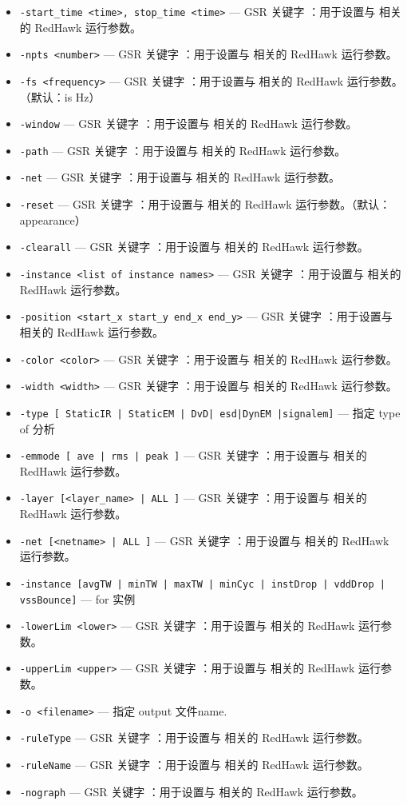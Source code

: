 \begin{itemize}
\item \texttt{-start\_time <time>, stop\_time <time>} — GSR 关键字 ：用于设置与  相关的 RedHawk 运行参数。
\item \texttt{-npts <number>} — GSR 关键字 ：用于设置与  相关的 RedHawk 运行参数。
\item \texttt{-fs <frequency>} — GSR 关键字 ：用于设置与  相关的 RedHawk 运行参数。（默认：is Hz）
\item \texttt{-window} — GSR 关键字 ：用于设置与  相关的 RedHawk 运行参数。
\item \texttt{-path} — GSR 关键字 ：用于设置与  相关的 RedHawk 运行参数。
\item \texttt{-net} — GSR 关键字 ：用于设置与  相关的 RedHawk 运行参数。
\item \texttt{-reset} — GSR 关键字 ：用于设置与  相关的 RedHawk 运行参数。（默认：appearance）
\item \texttt{-clearall} — GSR 关键字 ：用于设置与  相关的 RedHawk 运行参数。
\item \texttt{-instance <list of instance names>} — GSR 关键字 ：用于设置与  相关的 RedHawk 运行参数。
\item \texttt{-position <start\_x start\_y end\_x end\_y>} — GSR 关键字 ：用于设置与  相关的 RedHawk 运行参数。
\item \texttt{-color <color>} — GSR 关键字 ：用于设置与  相关的 RedHawk 运行参数。
\item \texttt{-width <width>} — GSR 关键字 ：用于设置与  相关的 RedHawk 运行参数。
\item \texttt{-type [ StaticIR | StaticEM | DvD| esd|DynEM |signalem]} — 指定 type of 分析
\item \texttt{-emmode [ ave | rms | peak ]} — GSR 关键字 ：用于设置与  相关的 RedHawk 运行参数。
\item \texttt{-layer [<layer\_name> | ALL ]} — GSR 关键字 ：用于设置与  相关的 RedHawk 运行参数。
\item \texttt{-net [<netname> | ALL ]} — GSR 关键字 ：用于设置与  相关的 RedHawk 运行参数。
\item \texttt{-instance [avgTW | minTW | maxTW | minCyc | instDrop | vddDrop | vssBounce]} — for 实例
\item \texttt{-lowerLim <lower>} — GSR 关键字 ：用于设置与  相关的 RedHawk 运行参数。
\item \texttt{-upperLim <upper>} — GSR 关键字 ：用于设置与  相关的 RedHawk 运行参数。
\item \texttt{-o <filename>} — 指定 output 文件name.
\item \texttt{-ruleType} — GSR 关键字 ：用于设置与  相关的 RedHawk 运行参数。
\item \texttt{-ruleName} — GSR 关键字 ：用于设置与  相关的 RedHawk 运行参数。
\item \texttt{-nograph} — GSR 关键字 ：用于设置与  相关的 RedHawk 运行参数。
\end{itemize}

